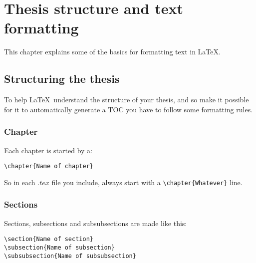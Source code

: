 \chapter{Thesis structure and text formatting}

This chapter explains some of the basics for formatting text in \LaTeX.

\section{Structuring the thesis}

To help \LaTeX\ understand the structure of your thesis, and so make it
possible for it to automatically generate a TOC you have to follow
some formatting rules.

\subsection{Chapter}

Each chapter is started by a:
\begin{verbatim}
\chapter{Name of chapter}
\end{verbatim}
So in each $.tex$ file you include, always start with a
\verb+\chapter{Whatever}+ line.

\subsection{Sections}
Sections, subsections and subsubsections are made like this:
\begin{verbatim}
\section{Name of section}
\subsection{Name of subsection}
\subsubsection{Name of subsubsection}
\end{verbatim}


